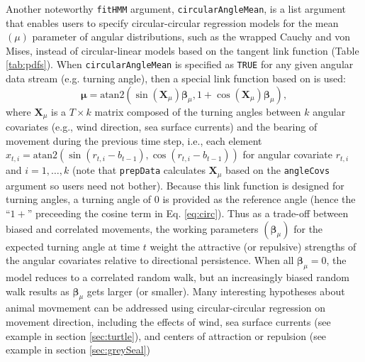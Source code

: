 \documentclass[12pt]{article}
\begin{document}
Another noteworthy \verb|fitHMM| argument, \verb|circularAngleMean|, is a list argument that enables users to specify circular-circular regression models for the mean $(\mu)$ parameter of angular distributions, such as the wrapped Cauchy and von Mises, instead of circular-linear models based on the tangent link function (Table \ref{tab:pdfs}). When \verb|circularAngleMean| is specified as \verb|TRUE| for any given angular data stream (e.g. turning angle), then a special link function based on \cite{DuchesneEtAl2015} is used:
\begin{equation}
  {\boldsymbol \mu}=\text{atan2}(\sin({\mathbf X}_\mu){\boldsymbol \beta}_\mu,1+\cos({\mathbf X}_\mu){\boldsymbol \beta}_\mu),
  \label{eq:circ}
\end{equation}
where ${\mathbf X}_\mu$ is a $T \times k$ matrix composed of the turning angles between $k$ angular covariates (e.g., wind direction, sea surface currents) and the bearing of movement during the previous time step, i.e., each element $x_{t,i}=\text{atan2}(\sin(r_{t,i}-b_{t-1}),\cos(r_{t,i}-b_{t-1}))$ for angular covariate $r_{t,i}$ and $i=1,\ldots,k$ (note that \verb|prepData| calculates ${\mathbf X}_\mu$ based on the \verb|angleCovs| argument so users need not bother). Because this link function is designed for turning angles, a turning angle of 0 is provided as the reference angle (hence the ``$1+$'' preceeding the cosine term in Eq. \ref{eq:circ}).  Thus as a trade-off between biased and correlated movements, the working parameters $({\boldsymbol \beta}_\mu)$ for the expected turning angle at time $t$ weight the attractive (or repulsive) strengths of the angular covariates relative to directional persistence.  When all ${\boldsymbol \beta}_\mu=0$, the model reduces to a correlated random walk, but an increasingly biased random walk results as ${\boldsymbol \beta}_\mu$ gets larger (or smaller). Many interesting hypotheses about animal movmement can be addressed using circular-circular regression on movement direction, including the effects of wind, sea surface currents (see example in section \ref{sec:turtle}), and centers of attraction or repulsion (see example in section \ref{sec:greySeal})
\end{document}
